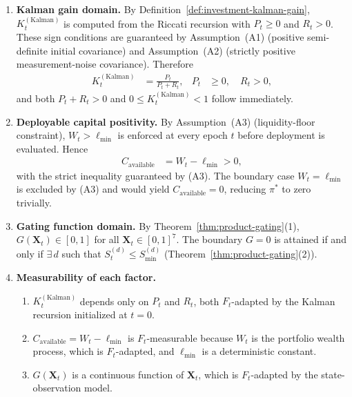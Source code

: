 \documentclass[12pt,openany]{book}
\newcommand{\calF}{\mathcal{F}}
\numberwithin{equation}{chapter}
\theoremstyle{plain}
\theoremstyle{definition}
\theoremstyle{remark}
\def\mathcal#1{#1}%
\begin{document}
\begin{enumerate}
  \item \textbf{Kalman gain domain.}
        By Definition~\ref{def:investment-kalman-gain},
        $K_t^{(\mathrm{Kalman})}$ is computed from the Riccati
        recursion with $P_t \geq 0$ and $R_t > 0$.  These sign
        conditions are guaranteed by Assumption~(A1) (positive
        semi-definite initial covariance) and
        Assumption~(A2) (strictly positive measurement-noise
        covariance).  Therefore
        \begin{align}
          K_t^{(\mathrm{Kalman})}
          &= \frac{P_t}{P_t + R_t}, &
          P_t &\geq 0,\quad R_t > 0,
        \end{align}
        and both $P_t + R_t > 0$ and
        $0 \leq K_t^{(\mathrm{Kalman})} < 1$ follow immediately.

  \item \textbf{Deployable capital positivity.}
        By Assumption~(A3) (liquidity-floor constraint),
        $W_t > \ell_{\min}$ is enforced at every epoch $t$
        before deployment is evaluated.  Hence
        \begin{align}
          C_{\mathrm{available}} &= W_t - \ell_{\min} > 0,
        \end{align}
        with the strict inequality guaranteed by (A3).  The
        boundary case $W_t = \ell_{\min}$ is excluded by (A3)
        and would yield $C_{\mathrm{available}} = 0$, reducing
        $\pi^*$ to zero trivially.

  \item \textbf{Gating function domain.}
        By Theorem~\ref{thm:product-gating}(1),
        $G(\mathbf{X}_t) \in [0,1]$ for all
        $\mathbf{X}_t \in [0,1]^7$.  The boundary $G = 0$
        is attained if and only if
        $\exists\,d$ such that
        $\mathcal{S}_t^{(d)} \leq \mathcal{S}_{\min}^{(d)}$
        (Theorem~\ref{thm:product-gating}(2)).

  \item \textbf{Measurability of each factor.}
        \begin{enumerate}
          \item[(a)] $K_t^{(\mathrm{Kalman})}$ depends only on
                $P_t$ and $R_t$, both $\calF_t$-adapted by
                the Kalman recursion initialized at $t=0$.
          \item[(b)] $C_{\mathrm{available}} = W_t - \ell_{\min}$
                is $\calF_t$-measurable because $W_t$ is the
                portfolio wealth process, which is
                $\calF_t$-adapted, and $\ell_{\min}$ is a
                deterministic constant.
          \item[(c)] $G(\mathbf{X}_t)$ is a continuous function
                of $\mathbf{X}_t$, which is $\calF_t$-adapted
                by the state-observation model.
        \end{enumerate}
\end{enumerate}
\end{document}
